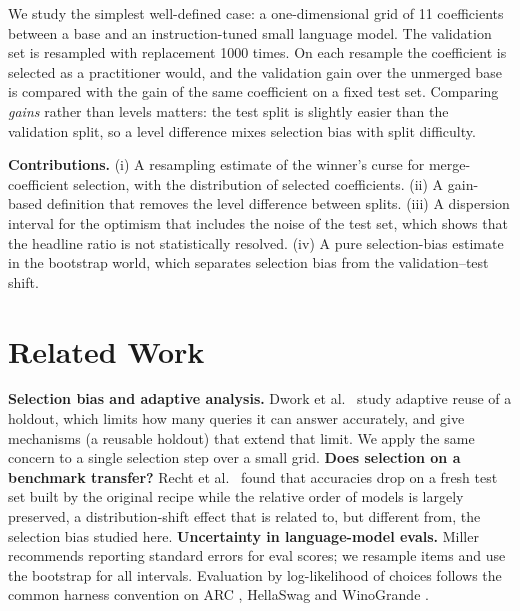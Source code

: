 \documentclass[conference]{IEEEtran}
\begin{document}
We study the simplest well-defined case: a one-dimensional grid of 11 coefficients between a base and an instruction-tuned small language model. The validation set is resampled with replacement 1000 times. On each resample the coefficient is selected as a practitioner would, and the validation gain over the unmerged base is compared with the gain of the same coefficient on a fixed test set. Comparing \emph{gains} rather than levels matters: the test split is slightly easier than the validation split, so a level difference mixes selection bias with split difficulty.

\textbf{Contributions.} (i) A resampling estimate of the winner's curse for merge-coefficient selection, with the distribution of selected coefficients. (ii) A gain-based definition that removes the level difference between splits. (iii) A dispersion interval for the optimism that includes the noise of the test set, which shows that the headline ratio is not statistically resolved. (iv) A pure selection-bias estimate in the bootstrap world, which separates selection bias from the validation--test shift.

\section{Related Work}
\textbf{Selection bias and adaptive analysis.} Dwork et al.\ \cite{dwork2014adaptive} study adaptive reuse of a holdout, which limits how many queries it can answer accurately, and give mechanisms (a reusable holdout) that extend that limit. We apply the same concern to a single selection step over a small grid. \textbf{Does selection on a benchmark transfer?} Recht et al.\ \cite{recht2019imagenet} found that accuracies drop on a fresh test set built by the original recipe while the relative order of models is largely preserved, a distribution-shift effect that is related to, but different from, the selection bias studied here. \textbf{Uncertainty in language-model evals.} Miller \cite{miller2024errorbars} recommends reporting standard errors for eval scores; we resample items and use the bootstrap \cite{efron1979bootstrap} for all intervals. Evaluation by log-likelihood of choices follows the common harness convention \cite{gao2021lmeval} on ARC \cite{clark2018arc}, HellaSwag \cite{zellers2019hellaswag} and WinoGrande \cite{sakaguchi2019winogrande}.
\end{document}
